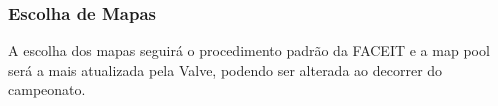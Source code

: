 \subsubsection{Escolha de Mapas}

A escolha dos mapas seguirá o procedimento padrão da FACEIT e a map pool será a mais atualizada pela Valve, podendo ser alterada ao decorrer do campeonato.
